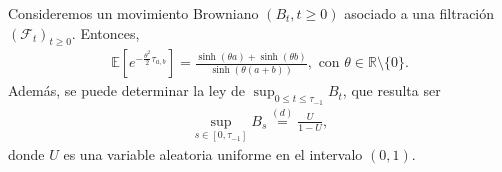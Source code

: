 \begin{proposition}
Consideremos un movimiento Browniano $(B_t, t \geq 0)$ asociado a una filtración $(\mathcal{F}_t)_{t \geq 0}$. Entonces, 
\begin{align*}
\mathbb{E} \left[ e^{- \frac{\theta^2}{2} \tau_{a, b}} \right] = \frac{\sinh(\theta a) + \sinh(\theta b)}{\sinh(\theta (a+b))}, \text{ con } \theta \in \mathbb{R} \setminus \{0\}.
\end{align*}
Además, se puede determinar la ley de $\sup_{0 \leq t \leq \tau_{-1}} B_t$, que resulta ser
\begin{align*}
\sup_{s \in [0, \tau_{-1}]} B_s \stackrel{(d)}{=} \frac{U}{1 - U},
\end{align*}
donde $U$ es una variable aleatoria uniforme en el intervalo $(0, 1)$.
\end{proposition}
